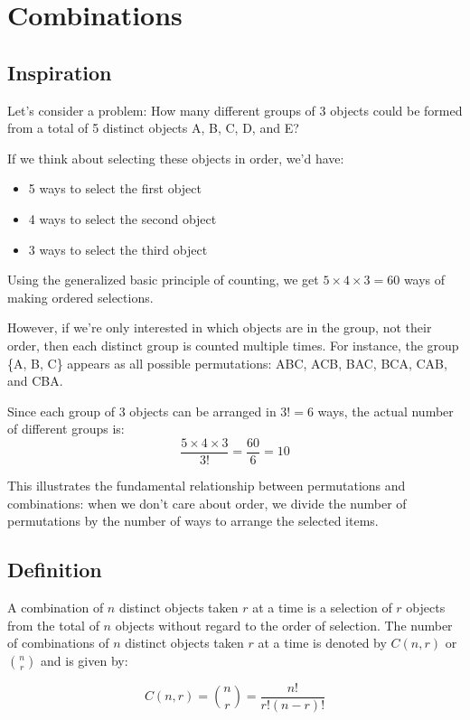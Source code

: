 \section{Combinations}
\subsection{Inspiration}

Let's consider a problem: How many different groups of 3 objects could be formed from a total of 5 distinct objects A, B, C, D, and E?

If we think about selecting these objects in order, we'd have:
\begin{itemize}
    \item 5 ways to select the first object
    \item 4 ways to select the second object
    \item 3 ways to select the third object
\end{itemize}

Using the generalized basic principle of counting, we get $5 \times 4 \times 3 = 60$ ways of making ordered selections.

However, if we're only interested in which objects are in the group, not their order, then each distinct group is counted multiple times. For instance, the group \{A, B, C\} appears as all possible permutations: ABC, ACB, BAC, BCA, CAB, and CBA.

Since each group of 3 objects can be arranged in $3! = 6$ ways, the actual number of different groups is:
\[ \frac{5 \times 4 \times 3}{3!} = \frac{60}{6} = 10 \]

This illustrates the fundamental relationship between permutations and combinations: when we don't care about order, we divide the number of permutations by the number of ways to arrange the selected items.
\subsection{Definition}
\begin{definitionbox}
    A combination of \(n\) distinct objects taken \(r\) at a time is a selection of \(r\) objects from the total of \(n\) objects without regard to the order of selection. The number of combinations of \(n\) distinct objects taken \(r\) at a time is denoted by \(C(n,r)\) or \(\binom{n}{r}\) and is given by:
    
    \[
    C(n,r) = \binom{n}{r} = \frac{n!}{r!(n-r)!}
    \]
\end{definitionbox}

